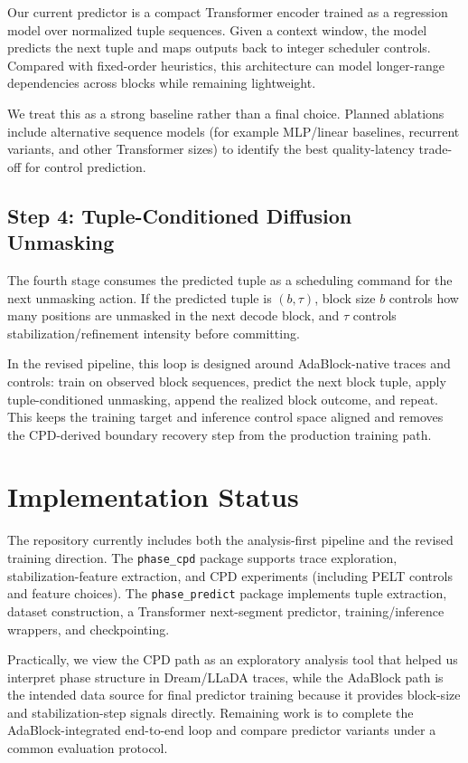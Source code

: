 \documentclass[11pt]{article}
\begin{document}
Our current predictor is a compact Transformer encoder trained as a regression model over normalized tuple sequences. Given a context window, the model predicts the next tuple and maps outputs back to integer scheduler controls. Compared with fixed-order heuristics, this architecture can model longer-range dependencies across blocks while remaining lightweight.

We treat this as a strong baseline rather than a final choice. Planned ablations include alternative sequence models (for example MLP/linear baselines, recurrent variants, and other Transformer sizes) to identify the best quality-latency trade-off for control prediction.

\subsection{Step 4: Tuple-Conditioned Diffusion Unmasking}

The fourth stage consumes the predicted tuple as a scheduling command for the next unmasking action. If the predicted tuple is $(b, \tau)$, block size $b$ controls how many positions are unmasked in the next decode block, and $\tau$ controls stabilization/refinement intensity before committing.

In the revised pipeline, this loop is designed around AdaBlock-native traces and controls: train on observed block sequences, predict the next block tuple, apply tuple-conditioned unmasking, append the realized block outcome, and repeat. This keeps the training target and inference control space aligned and removes the CPD-derived boundary recovery step from the production training path.

\section{Implementation Status}

The repository currently includes both the analysis-first pipeline and the revised training direction. The \texttt{phase\_cpd} package supports trace exploration, stabilization-feature extraction, and CPD experiments (including PELT controls and feature choices). The \texttt{phase\_predict} package implements tuple extraction, dataset construction, a Transformer next-segment predictor, training/inference wrappers, and checkpointing.

Practically, we view the CPD path as an exploratory analysis tool that helped us interpret phase structure in Dream/LLaDA traces, while the AdaBlock path is the intended data source for final predictor training because it provides block-size and stabilization-step signals directly. Remaining work is to complete the AdaBlock-integrated end-to-end loop and compare predictor variants under a common evaluation protocol.
\end{document}
